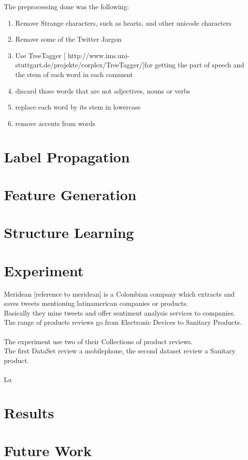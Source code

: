\documentclass[4pt,a4paper,twocolumn]{article}
\begin{document}
The preprocessing done was the following:
\begin{enumerate}
	\item Remove Strange characters, such as hearts, and other unicode characters
	\item Remove some of the Twitter Jargon 
	\item Use TreeTagger [ http://www.ims.uni-stuttgart.de/projekte/corplex/TreeTagger/]for getting the part of speech and the stem of each word in each comment
	\item discard those words that are not adjectives, nouns or verbs
	\item replace each word by its stem in lowercase
	\item remove accents from words
\end{enumerate}

\part*{Label Propagation}

\part*{Feature Generation}
\part*{Structure Learning}

\part*{Experiment}
Meridean [reference to meridean] is a Colombian company which extracts and saves tweets
mentioning latinamerican companies or products.\\
Basically they mine  tweets and offer sentiment analysis services to companies.\\
The range of products reviews go from Electronic Devices to Sanitary Products.\\
\\
The experiment use two of their Collections of product reviews.\\
The first DataSet review a mobilephone, the second dataset review a Sanitary product.\\
\\
La

\part*{Results}
\part*{Future Work}
\end{document}
